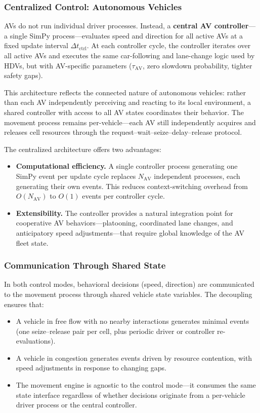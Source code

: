 \documentclass[review,authoryear]{elsarticle}
\begin{document}
\subsubsection{Centralized Control: Autonomous Vehicles}

AVs do not run individual driver processes. Instead, a \textbf{central AV controller}---a single SimPy process---evaluates speed and direction for all active AVs at a fixed update interval $\Delta t_{\text{ctrl}}$. At each controller cycle, the controller iterates over all active AVs and executes the same car-following and lane-change logic used by HDVs, but with AV-specific parameters ($\tau_{\text{AV}}$, zero slowdown probability, tighter safety gaps).

This architecture reflects the connected nature of autonomous vehicles: rather than each AV independently perceiving and reacting to its local environment, a shared controller with access to all AV states coordinates their behavior. The movement process remains per-vehicle---each AV still independently acquires and releases cell resources through the request--wait--seize--delay--release protocol.

The centralized architecture offers two advantages:
\begin{itemize}
    \item \textbf{Computational efficiency.} A single controller process generating one SimPy event per update cycle replaces $N_{\text{AV}}$ independent processes, each generating their own events. This reduces context-switching overhead from $O(N_{\text{AV}})$ to $O(1)$ events per controller cycle.
    \item \textbf{Extensibility.} The controller provides a natural integration point for cooperative AV behaviors---platooning, coordinated lane changes, and anticipatory speed adjustments---that require global knowledge of the AV fleet state.
\end{itemize}

\subsubsection{Communication Through Shared State}

In both control modes, behavioral decisions (speed, direction) are communicated to the movement process through shared vehicle state variables. The decoupling ensures that:

\begin{itemize}
    \item A vehicle in free flow with no nearby interactions generates minimal events (one seize--release pair per cell, plus periodic driver or controller re-evaluations).
    \item A vehicle in congestion generates events driven by resource contention, with speed adjustments in response to changing gaps.
    \item The movement engine is agnostic to the control mode---it consumes the same state interface regardless of whether decisions originate from a per-vehicle driver process or the central controller.
\end{itemize}
\end{document}
